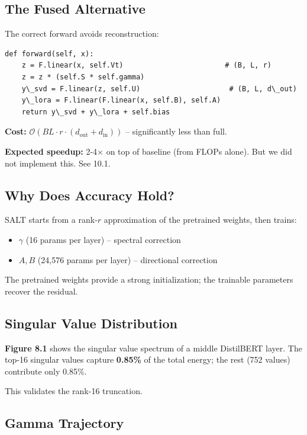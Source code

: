 \subsection{The Fused Alternative}

The correct forward avoids reconstruction:

\begin{lstlisting}
def forward(self, x):
    z = F.linear(x, self.Vt)                        # (B, L, r)
    z = z * (self.S * self.gamma)
    y\_svd = F.linear(z, self.U)                     # (B, L, d\_out)
    y\_lora = F.linear(F.linear(x, self.B), self.A)
    return y\_svd + y\_lora + self.bias
\end{lstlisting}

\textbf{Cost:} $\mathcal{O}(BL \cdot r \cdot (d_\text{out} + d_\text{in}))$ -- 
significantly less than full.

\textbf{Expected speedup:} 2-4$\times$ on top of baseline (from FLOPs alone). But we did 
not implement this. See  10.1.

\subsection{Why Does Accuracy Hold?}

SALT starts from a rank-$r$ approximation of the pretrained weights, then 
trains:

\begin{itemize}
\item $\gamma$ (16 params per layer) -- spectral correction
\item $A, B$ (24,576 params per layer) -- directional correction

\end{itemize}
The pretrained weights provide a strong initialization; the trainable 
parameters recover the residual.

\subsection{Singular Value Distribution}

\textbf{Figure 8.1} shows the singular value spectrum of a middle DistilBERT 
layer. The top-16 singular values capture \textbf{0.85\%} of the 
total energy; the rest (752 values) contribute only 0.85\%.

This validates the rank-16 truncation.

\subsection{Gamma Trajectory}


